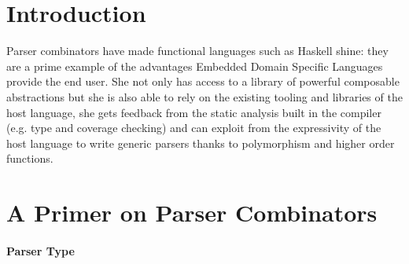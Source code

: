 \documentclass[sigplan,review,anonymous]{acmart}\settopmatter{printfolios=true}
\begin{document}
\begin{CCSXML}
\end{CCSXML}





\maketitle


\section{Introduction}

Parser combinators have made functional languages such as Haskell
shine: they are a prime example of the advantages Embedded Domain
Specific Languages provide the end user. She not only has access
to a library of powerful composable abstractions but she is also
able to rely on the existing tooling and libraries of the host
language, she gets feedback from the static analysis built in the
compiler (e.g. type and coverage checking) and can exploit from
the expressivity of the host language to write generic parsers
thanks to polymorphism and higher order functions.


\section{A Primer on Parser Combinators}

\paragraph{Parser Type}
\end{document}
